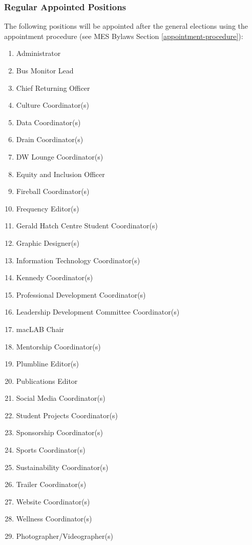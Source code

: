 \subsubsection{Regular Appointed Positions}
\label{regular-appointed-positions}
The following positions will be appointed after the general elections
using the appointment procedure (see MES Bylaws Section \ref{appointment-procedure}): %

\begin{enumerate}
 \item
  Administrator
 \item
  Bus Monitor Lead
 \item
  Chief Returning Officer
 \item
  Culture Coordinator(s)
 \item
  Data Coordinator(s)
 \item
  Drain Coordinator(s)
 \item
  DW Lounge Coordinator(s)
 \item
  Equity and Inclusion Officer
 \item
  Fireball Coordinator(s)
 \item
  Frequency Editor(s)
 \item
  Gerald Hatch Centre Student Coordinator(s)
 \item
  Graphic Designer(s)
 \item
  Information Technology Coordinator(s)
 \item
  Kennedy Coordinator(s)
 \item
  Professional Development Coordinator(s)
 \item
  Leadership Development Committee Coordinator(s)
 \item
  macLAB Chair
 \item
  Mentorship Coordinator(s)
 \item
  Plumbline Editor(s)
 \item
  Publications Editor
 \item
  Social Media Coordinator(s)
 \item
  Student Projects Coordinator(s)
 \item
  Sponsorship Coordinator(s)
 \item
  Sports Coordinator(s)
 \item
  Sustainability Coordinator(s)
 \item
  Trailer Coordinator(s)
 \item
  Website Coordinator(s)
 \item
  Wellness Coordinator(s)
 \item
  Photographer/Videographer(s)
\end{enumerate}

